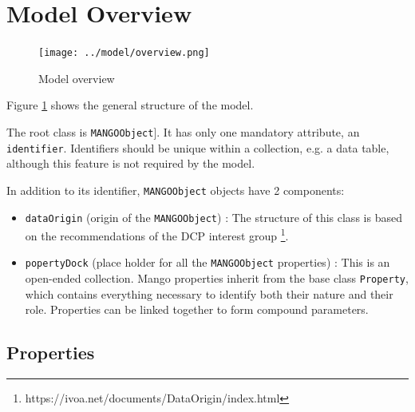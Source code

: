 \documentclass[11pt,a4paper]{ivoa}
\begin{document}
\section{Model Overview}

\begin{figure}
     \texttt{[image: ../model/overview.png]}
     \caption{Model overview}
     \label{fig:overview}
\end{figure}

Figure \ref{fig:overview} shows the general structure of the model.

The root class is \texttt{MANGOObject}]. 
It has only one mandatory attribute, an \texttt{identifier}.
Identifiers should be unique within a collection, e.g. a data table, although 
this feature is not required by the model.

In addition to its identifier, \texttt{MANGOObject} objects have 2 components:

\begin{itemize}[noitemsep,topsep=0pt,parsep=0pt,partopsep=0pt]

  \item \texttt{dataOrigin} (origin of the \texttt{MANGOObject}) : The structure of this class is based on
        the recommendations of the DCP interest group \footnote{https://ivoa.net/documents/DataOrigin/index.html}.
  \item \texttt{popertyDock} (place holder for all the \texttt{MANGOObject} properties) :
        This is an open-ended collection.
        Mango properties inherit from the base class \texttt{Property},
        which contains everything necessary to identify both their nature and their role.
        Properties can be linked together to form compound parameters.
\end{itemize}


\subsection{Properties}
\end{document}
